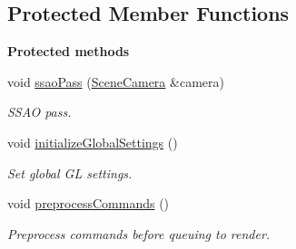 \subsection*{Protected Member Functions}
\begin{Indent}\textbf{ Protected methods}\par
\begin{DoxyCompactItemize}
\item 
\mbox{\label{classrev_1_1_main_renderer_a6a0ce3c1092850e6ce018c980812bec6}} 
void \mbox{\hyperlink{classrev_1_1_main_renderer_a6a0ce3c1092850e6ce018c980812bec6}{ssao\+Pass}} (\mbox{\hyperlink{classrev_1_1_scene_camera}{Scene\+Camera}} \&camera)
\begin{DoxyCompactList}\small\item\em S\+S\+AO pass. \end{DoxyCompactList}\item 
\mbox{\label{classrev_1_1_main_renderer_ade04bc9459699992f3b39bf79a3cb612}} 
void \mbox{\hyperlink{classrev_1_1_main_renderer_ade04bc9459699992f3b39bf79a3cb612}{initialize\+Global\+Settings}} ()
\begin{DoxyCompactList}\small\item\em Set global GL settings. \end{DoxyCompactList}\item 
\mbox{\label{classrev_1_1_main_renderer_adff15f2c79f6d628ac7c801855471209}} 
void \mbox{\hyperlink{classrev_1_1_main_renderer_adff15f2c79f6d628ac7c801855471209}{preprocess\+Commands}} ()
\begin{DoxyCompactList}\small\item\em Preprocess commands before queuing to render. \end{DoxyCompactList}\end{DoxyCompactItemize}
\end{Indent}
